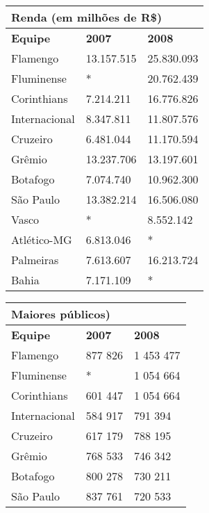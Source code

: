 \documentclass[a4paper,14pt]{article}
\begin{document}
\begin{multicols}{2}
\begin{enumerate}
			\begin{table}[H]
				\begin{tabular}{|p{2.6cm}|p{2.4cm}|p{2.4cm}|}
					\hline
					\multicolumn{3}{|p{6.8cm}|}{\textbf{Renda (em milhões de R\$)}} \\
					\hline
					\textbf{Equipe} & \textbf{2007} & \textbf{2008} \\ \hline
					Flamengo & 13.157.515 & 25.830.093 \\ \hline
					Fluminense & * & 20.762.439 \\ \hline
					Corinthians & 7.214.211 & 16.776.826 \\ \hline
					Internacional & 8.347.811 & 11.807.576 \\ \hline
					Cruzeiro & 6.481.044 & 11.170.594 \\ \hline
					Grêmio & 13.237.706 & 13.197.601 \\ \hline
					Botafogo & 7.074.740 & 10.962.300 \\ \hline
					São Paulo & 13.382.214 & 16.506.080 \\ \hline
					Vasco & * & 8.552.142 \\ \hline
					Atlético-MG & 6.813.046 & * \\ \hline
					Palmeiras & 7.613.607 & 16.213.724 \\ \hline
					Bahia & 7.171.109 & * \\ \hline
				\end{tabular}
			\end{table}
			\begin{table}[H]
				\begin{tabular}{|p{2.6cm}|p{2.4cm}|p{2.4cm}|}
					\hline
					\multicolumn{3}{|p{6.8cm}|}{\textbf{Maiores públicos)}} \\
					\hline
					\textbf{Equipe} & \textbf{2007} & \textbf{2008} \\ \hline
					Flamengo & 877 826 & 1 453 477 \\ \hline
					Fluminense & * & 1 054 664 \\ \hline
					Corinthians & 601 447 & 1 054 664 \\ \hline
					Internacional & 584 917 & 791 394 \\ \hline
					Cruzeiro & 617 179 & 788 195 \\ \hline
					Grêmio & 768 533 & 746 342 \\ \hline
					Botafogo & 800 278 & 730 211 \\ \hline
					São Paulo & 837 761 & 720 533 \\ \hline

\end{tabular}
\end{table}
\end{enumerate}
\end{multicols}
\end{document}
